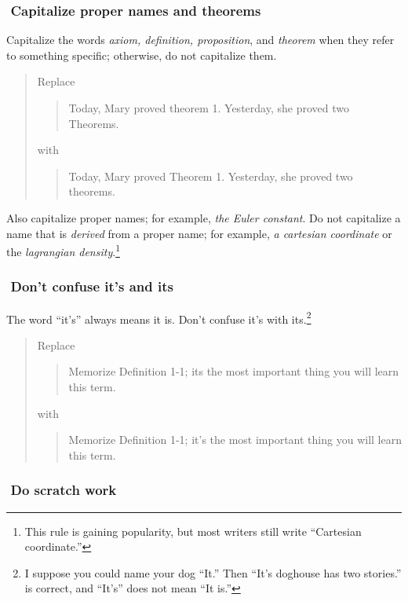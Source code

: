\documentclass[12pt,fleqn]{article}
\newcounter{ex}\setcounter{ex}{0}
\newcommand{\ex}{%
\hspace{-0.2in} \setcounter{ex}{\value{ex}+1}
\theex \,\,}
\newcounter{se}\setcounter{se}{0}
\begin{document}
\subsubsection*{\ex  Capitalize proper names and theorems}

Capitalize the words {\em axiom, definition, proposition\/}, and {\em theorem\/}
when they refer to something specific; otherwise, do not
capitalize them.

\begin{quote}
Replace
\begin{quote}
Today, Mary proved theorem 1. Yesterday, she proved two Theorems.
\end{quote}
with
\begin{quote}
Today, Mary proved Theorem 1. Yesterday, she proved two theorems.
\end{quote}
\end{quote}
Also capitalize proper names; for example, {\em the Euler
constant}. Do not capitalize a name that is {\em derived\/} from a
proper name; for example, {\em a cartesian coordinate\/} or the {\em
lagrangian density}.\footnote{This rule is gaining popularity, but
most writers still write ``Cartesian coordinate.'' }


\subsubsection*{\ex  Don't confuse it's and its}

The word ``it's'' always means it is. Don't confuse it's with its.\footnote{I suppose you
could name your dog ``It.'' Then ``It's doghouse has two stories.'' is correct,
and ``It's'' does not mean ``It is.''} 

\begin{quote}
Replace
\begin{quote}
Memorize Definition 1-1; its the most important thing you will learn
this term.
\end{quote}
with
\begin{quote}
Memorize Definition 1-1; it's the most important thing you will learn
this term.
\end{quote}
\end{quote}




\subsubsection*{\ex Do scratch work}
\end{document}
